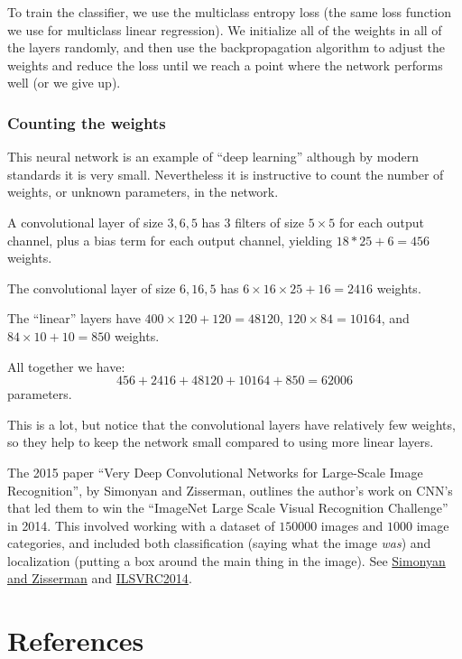 \documentclass[
  11pt,
  letterpaper,
]{scrbook}
\theoremstyle{plain}
\theoremstyle{remark}
\begin{document}
To train the classifier, we use the multiclass entropy loss (the same
loss function we use for multiclass linear regression). We initialize
all of the weights in all of the layers randomly, and then use the
backpropagation algorithm to adjust the weights and reduce the loss
until we reach a point where the network performs well (or we give up).

\hypertarget{counting-the-weights}{%
\subsection{Counting the weights}\label{counting-the-weights}}

This neural network is an example of ``deep learning'' although by
modern standards it is very small. Nevertheless it is instructive to
count the number of weights, or unknown parameters, in the network.

A convolutional layer of size \(3,6,5\) has \(3\) filters of size
\(5\times 5\) for each output channel, plus a bias term for each output
channel, yielding \(18*25+6=456\) weights.

The convolutional layer of size \(6,16,5\) has
\(6\times 16\times 25+16=2416\) weights.

The ``linear'' layers have \(400\times 120+120=48120\),
\(120\times 84=10164\), and \(84\times 10 + 10 = 850\) weights.

All together we have: \[
456+2416+48120+10164+850=62006
\] parameters.

This is a lot, but notice that the convolutional layers have relatively
few weights, so they help to keep the network small compared to using
more linear layers.

The 2015 paper ``Very Deep Convolutional Networks for Large-Scale Image
Recognition'', by Simonyan and Zisserman, outlines the author's work on
CNN's that led them to win the ``ImageNet Large Scale Visual Recognition
Challenge'' in 2014. This involved working with a dataset of \(150000\)
images and \(1000\) image categories, and included both classification
(saying what the image \emph{was}) and localization (putting a box
around the main thing in the image). See
\href{https://arxiv.org/abs/1409.1556}{Simonyan and Zisserman} and
\href{https://www.image-net.org/challenges/LSVRC/2014/}{ILSVRC2014}.


\hypertarget{references}{%
\chapter*{References}\label{references}}
\end{document}
